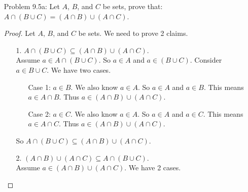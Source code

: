 \documentclass{article}
\theoremstyle{claim}
\theoremstyle{definition}
\begin{document}
\begin{enumerate}
\begin{enumerate}
\begin{proof}
                By Trichotomy and (b), (c), (d), and (e), $A$ has to be one of the form: $(a, b), (a, b]), [a, b), [a, b], (a, \infty), [a, \infty), (-\infty, b), (-\infty, b] \text{ or } \mathbb{R}$.\\
                By the definition of interval, assume $a, b \in \mathbb{R}$ so that $a = b$, then by Trichotomy and interval notation, we have 2 cases:
                \begin{enumerate}
                    \item[1.] If $r \in A$, then $a < r < a$.
                        Assume $r \in A$, $a < r < a$. There's no $r$ satisfy that condition. So $A = \emptyset$.
                    \item[2.] If $r \in A$, then $a \le r \le a$.
                        Assume $r \in A$, $a \le r \le a$. By Trichotomy, $r = a$. So $A = \{ a \}$.
                \end{enumerate}
            \end{proof}
        \end{enumerate}
    \item[Problem 9.5a:] Let $A$, $B$, and $C$ be sets, prove that: $A \cap (B \cup C) = (A \cap B) \cup (A \cap C)$.
        \begin{proof}
            Let $A$, $B$, and $C$ be sets. We need to prove 2 claims.
            \begin{enumerate}
                \item[1.] $A \cap (B \cup C) \subseteq (A \cap B) \cup (A \cap C)$.\\
                    Assume $a \in A \cap (B \cup C)$. So $a \in A$ and $a \in (B \cup C)$. Consider $a \in B \cup C$. We have two cases.
                    \begin{enumerate}
                        \item[Case 1:] $a \in B$. We also know $a \in A$. So $a \in A$ and $a \in B$. This means $a \in A \cap B$. Thus $a \in (A \cap B) \cup (A \cap C)$.
                        \item[Case 2:] $a \in C$. We also know $a \in A$. So $a \in A$ and $a \in C$. This means $a \in A \cap C$. Thus $a \in (A \cap B) \cup (A \cap C)$. 
                    \end{enumerate}
                    So $A \cap (B \cup C) \subseteq (A \cap B) \cup (A \cap C)$.
                \item[2.] $(A \cap B) \cup (A \cap C) \subseteq A \cap (B \cup C)$.\\
                    Assume $a \in (A \cap B) \cup (A \cap C)$. We have 2 cases.

\end{enumerate}
\end{proof}
\end{enumerate}
\end{document}
